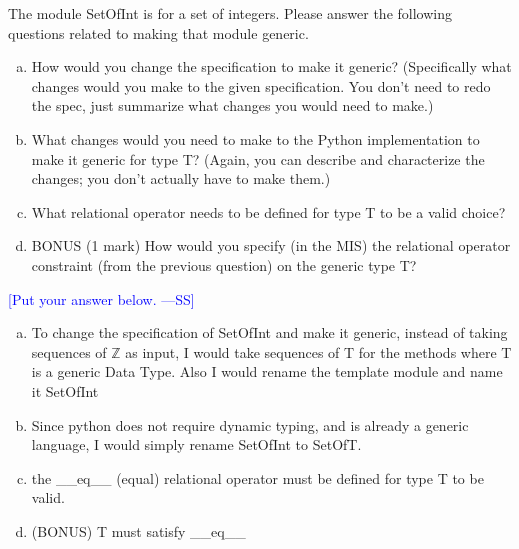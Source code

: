 \documentclass[12pt,fleqn]{examtst}
\newcommand{\authornote}[3]{\textcolor{#1}{[#3 ---#2]}}
\newcommand{\authornote}[3]{}
\newcommand{\wss}[1]{\authornote{blue}{SS}{#1}}
\begin{document}

\newpage

\noindent
\begin{minipage}{\textwidth}

The module SetOfInt is for a set of integers.  Please answer the following
questions related to making that module generic. 
\begin{enumerate}[a.]
\item How would you change the specification to make it generic?  (Specifically
  what changes would you make to the given specification.  You don't need to
  redo the spec, just summarize what changes you would need to make.)
\item What changes would you need to make to the Python
implementation to make it generic for type T?  (Again, you can describe and
characterize the changes; you don't actually have to make them.)
\item What relational operator needs to be defined for type T to be a valid
  choice?
\item BONUS (1 mark) How would you specify (in the MIS) the relational operator
  constraint (from the previous question) on the generic type T?
\end{enumerate}

\wss{Put your answer below.}

\begin{enumerate}[a.]
\item To change the specification of SetOfInt and make it generic, instead of taking sequences of $\mathbb{Z}$ as input, I would take
sequences of T for the methods where T is a generic Data Type. Also I would rename the template module and name it SetOfInt
\item Since python does not require dynamic typing, and is already a generic language, I would simply rename SetOfInt to SetOfT.
\item the \_\_eq\_\_ (equal) relational operator must be defined for type T to be valid.
\item (BONUS) T must satisfy \_\_eq\_\_
\end{enumerate}

\end{minipage}
\end{document}
